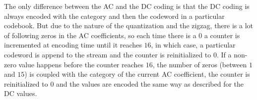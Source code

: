 \vspace{1em}

The only difference between the AC and the DC coding is that the DC coding is always encoded with the category and then the codeword in a particular codebook. But due to the nature of the quantization and the zigzag, there is a lot of following zeros in the AC coefficients, so each time there is a $0$ a counter is incremented at encoding time until it reaches $16$, in which case, a particular codeword is append to the stream and the counter is reinitialized to $0$. 
If a non-zero value happens before the counter reaches $16$, the number of zeros (between $1$ and $15$) is coupled with the category of the current AC coefficient, the counter is reinitialized to $0$ and the values are encoded the same way as described for the DC values.

%
